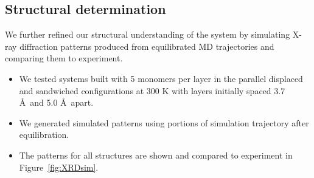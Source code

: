 \documentclass{article}
\begin{document}
  \subsection{Structural determination}
  
  We further refined our structural understanding of the system by simulating X-ray 
  diffraction patterns produced from equilibrated MD trajectories and comparing them
  to experiment. 
  \begin{itemize}
	  	\item We tested systems built with 5 monomers per layer in the parallel 
		displaced and sandwiched configurations at 300 K with layers initially spaced
		3.7 \AA~and 5.0 \AA~apart.
		\item We generated simulated patterns using portions of simulation trajectory
		after equilibration.
		\item The patterns for all structures are shown and compared to experiment
		in Figure~\ref{fig:XRDsim}.
  \end{itemize}


  
\end{document}
